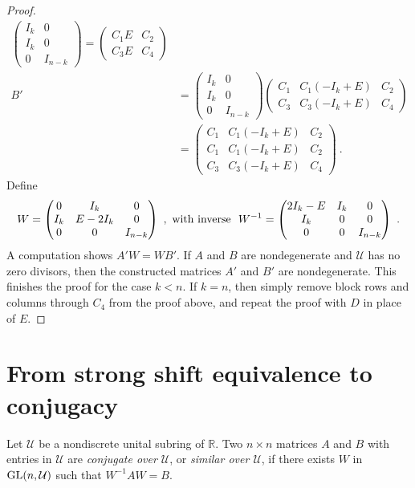 \documentclass{amsart}
\theoremstyle{definition}
\theoremstyle{remark}
\numberwithin{equation}{section}
\begin{document}
{\begin{proof}
\begin{align*}
\begin{pmatrix} I_k & 0 \\ I_k& 0 \\ 0 & I_{n-k} \end{pmatrix} 
=\begin{pmatrix} C_1E & C_2\\C_3E&C_4 \end{pmatrix}  \\ 
B'&= 
\begin{pmatrix} I_k & 0 \\ I_k& 0 \\ 0 & I_{n-k} \end{pmatrix} 
 \begin{pmatrix} C_1 & C_1(-I_k+E)& C_2\\ 
C_3 & C_3(-I_k+E) &C_4 \end{pmatrix} \\ 
&=  \begin{pmatrix} C_1 & C_1(-I_k+E)& C_2\\ C_1 & C_1(-I_k+E)& C_2\\ 
 C_3 & C_3(-I_k+E) &C_4 \end{pmatrix} \ .
\end{align*} 
Define 
\[ 
W =\begin{pmatrix} 0 & I_k & 0 \\ I_k & E-2I_k & 0 \\ 0 & 0 & I_{n-k}
\end{pmatrix}\ , \textnormal{ with inverse }\  
W^{-1} =  
\begin{pmatrix} 2I_k -E & I_k & 0 \\ I_k & 0 & 0 \\ 0 & 0 & I_{n-k}
\end{pmatrix}\ . 
\]  
A computation shows $A'W = WB'$. If $A$ and $B$ are nondegenerate and 
$\mathcal U$ has no zero divisors,  
then the constructed matrices $A'$ and $B'$ are nondegenerate. 
This finishes the proof for the case $k<n$. If $k=n$, then  
simply remove block rows and columns through $C_4$ from the proof above, 
and repeat the proof with $D$ in place of $E$. 
\end{proof}

\section {From strong shift equivalence to conjugacy} \label{fromsse}

 Let $\mathcal U$ be a nondiscrete unital subring of 
$\mathbb R$. Two $n\times n$ matrices   $A$ and $B$ 
with entries in 
$\mathcal U$ are {\it  conjugate over $\mathcal U$}, 
or {\it similar over $\mathcal U$}, if there 
exists $W$ in $\textnormal{GL}(n,\mathcal U)$ such that 
$W^{-1}AW =B$. 

}
\end{document}
